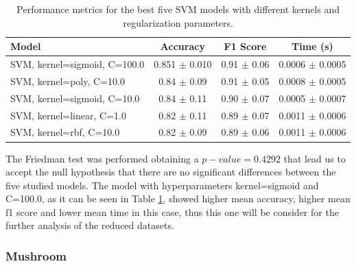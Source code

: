 \begin{table}[h!]
\centering
\begin{tabular}{|l|c|c|c|}
\hline
\textbf{Model} & \textbf{Accuracy} & \textbf{F1 Score} & \textbf{Time (s)} \\
\hline
SVM, kernel=sigmoid, C=100.0 & 0.851 $\pm$ 0.010 & 0.91 $\pm$ 0.06 & 0.0006 $\pm$ 0.0005 \\
\hline
SVM, kernel=poly, C=10.0     & 0.84 $\pm$ 0.09 & 0.91 $\pm$ 0.05 & 0.0008 $\pm$ 0.0005 \\
\hline
SVM, kernel=sigmoid, C=10.0  & 0.84 $\pm$ 0.11 & 0.90 $\pm$ 0.07 & 0.0005 $\pm$ 0.0007 \\
\hline
SVM, kernel=linear, C=1.0    & 0.82 $\pm$ 0.11 & 0.89 $\pm$ 0.07 & 0.0011 $\pm$ 0.0006 \\
\hline
SVM, kernel=rbf, C=10.0      & 0.82 $\pm$ 0.09 & 0.89 $\pm$ 0.06 & 0.0011 $\pm$ 0.0006 \\
\hline
\end{tabular}
\caption{Performance metrics for the best five SVM models with different kernels and regularization parameters.}
\label{tab:svm_metrics}
\end{table}

The Friedman test was performed obtaining a $p-value=0.4292$ that lead us to accept the null hypothesis that there are no significant differences between the five studied models. The model with hyperparameters kernel=sigmoid and C=100.0, as it can be seen in Table \ref{tab:svm_metrics}, showed higher mean accuracy, higher mean f1 score and lower mean time in this case, thus this one will be consider for the further analysis of the reduced datasets.

\subsubsection{Mushroom}
